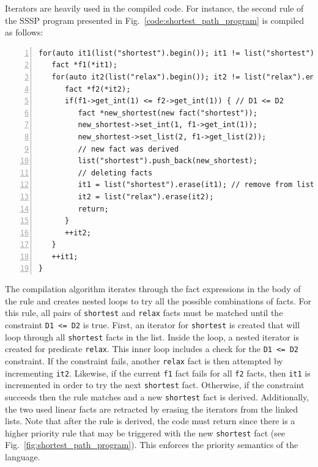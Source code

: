 Iterators are heavily used in the compiled code. For instance, the second rule
of the SSSP program presented in Fig.~\ref{code:shortest_path_program} is
compiled as follows:

\begin{Verbatim}[numbers=left,fontsize=\scriptsize,xleftmargin=\codemargin]
for(auto it1(list("shortest").begin()); it1 != list("shortest").end(); ) {
   fact *f1(*it1);
   for(auto it2(list("relax").begin()); it2 != list("relax").end(); ) {
      fact *f2(*it2);
      if(f1->get_int(1) <= f2->get_int(1)) { // D1 <= D2
         fact *new_shortest(new fact("shortest"));
         new_shortest->set_int(1, f1->get_int(1));
         new_shortest->set_list(2, f1->get_list(2));
         // new fact was derived
         list("shortest").push_back(new_shortest);
         // deleting facts
         it1 = list("shortest").erase(it1); // remove from list
         it2 = list("relax").erase(it2);
         return;
      }
      ++it2;
   }
   ++it1;
}
\end{Verbatim}

The compilation algorithm iterates through the fact expressions in the body of
the rule and creates nested loops to try all the possible combinations of facts.
For this rule, all pairs of \texttt{shortest} and \texttt{relax} facts must be
matched until the constraint \texttt{D1 <= D2} is true. First, an iterator for
\texttt{shortest} is created that will loop through all \texttt{shortest} facts
in the list. Inside the loop, a nested iterator is created for predicate
\texttt{relax}. This inner loop includes a check for the \texttt{D1 <= D2}
constraint. If the constraint fails, another \texttt{relax} fact is then
attempted by incrementing \texttt{it2}. Likewise, if the current \texttt{f1}
fact fails for all \texttt{f2} facts, then \texttt{it1} is incremented in order
to try the next \texttt{shortest} fact. Otherwise, if the constraint succeeds
then the rule matches and a new \texttt{shortest} fact is derived. Additionally,
the two used linear facts are retracted by erasing the iterators from the linked
lists.  Note that after the rule is derived, the code must return since there is
a higher priority rule that may be triggered with the new \texttt{shortest} fact
(see Fig.~\ref{fig:shortest_path_program}). This enforces the priority semantics
of the language.
    

